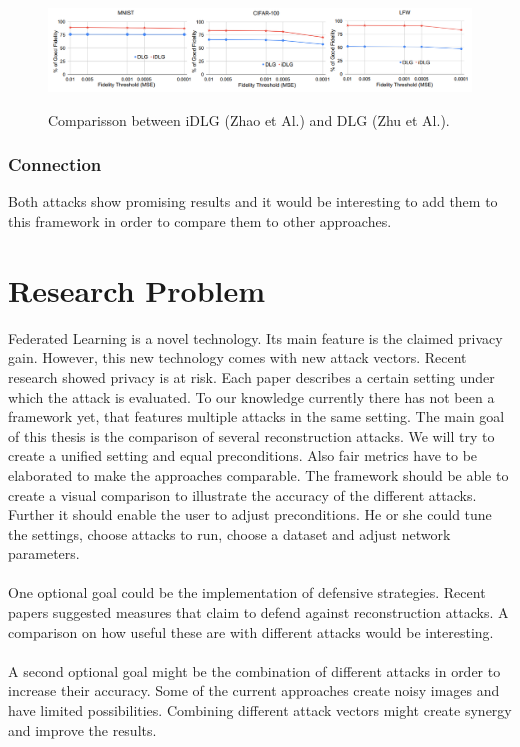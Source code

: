 \documentclass[
	ngerman,
	ruledheaders=section,%
	class=report,%
	thesis={type=bachelor},%
	accentcolor=1b,%
	custommargins=true,%
	marginpar=false,%
	parskip=half-,%
	fontsize=11pt,%
]{tudapub}
\begin{document}
\begin{figure}[H] 
  \centering
    \includegraphics[width=1\textwidth]{Figures/DLG_vs_iDLG.PNG}\\
  \caption{Comparisson between iDLG (Zhao et Al.) and DLG (Zhu et Al.).\cite{zhao2020idlg}}
  \label{fig:dlg_vs_idlg}
\end{figure}


\subsection{Connection}
Both attacks show promising results and it would be interesting to add them to this framework in order to compare them to other approaches.





\chapter{Research Problem}\label{sec:research_problem}
Federated Learning is a novel technology. Its main feature is the claimed privacy gain. However, this new technology comes with new attack vectors. Recent research showed privacy is at risk. Each paper describes a certain setting under which the attack is evaluated. To our knowledge currently there has not been a framework yet, that features multiple attacks in the same setting. The main goal of this thesis is the comparison of several reconstruction attacks. We will try to create a unified setting and equal preconditions. Also fair metrics have to be elaborated to make the approaches comparable. The framework should be able to create a visual comparison to illustrate the accuracy of the different attacks. Further it should enable the user to adjust preconditions. He or she could tune the settings, choose attacks to run, choose a dataset and adjust network parameters.\\
\\
One optional goal could be the implementation of defensive strategies. Recent papers suggested measures that claim to defend against reconstruction attacks. A comparison on how useful these are with different attacks would be interesting.\\
\\
A second optional goal might be the combination of different attacks in order to increase their accuracy. Some of the current approaches create noisy images and have limited possibilities. Combining different attack vectors might create synergy and improve the results.
\end{document}
